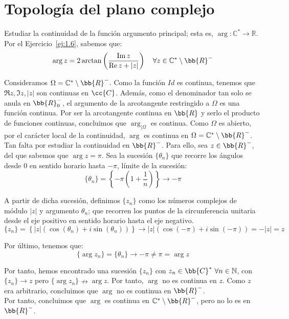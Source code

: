 \section{Topología del plano complejo}

\begin{ejercicio}
    Estudiar la continuidad de la función argumento principal; esta es, $\arg : \mathbb{C}^\ast \to \mathbb{R}$.\\

    Por el Ejercicio~\ref{ej:1.6}, sabemos que:
    \begin{equation*}
        \arg z = 2\arctan\left(\frac{\Im z}{\Re z + |z|}\right) \quad \forall z \in \mathbb{C}^\ast\setminus \bb{R}^-
    \end{equation*}

    Consideramos $\Omega = \mathbb{C}^\ast\setminus \bb{R}^-$. Como la función $Id$ es continua, tenemos que $\Re z,\Im z, |z|$ son continuas en $\cc{C}$. Además, como el denominador tan solo se anula en $\bb{R}^-_0$, el argumento de la arcotangente restringido a $\Omega$ es una función continua. Por ser la arcotangente continua en $\bb{R}$ y serlo el producto de funciones continuas, concluimos que $\arg_{\big| \Omega}$ es continua. Como $\Omega$ es abierto, por el carácter local de la continuidad, $\arg$ es continua en $\Omega=\mathbb{C}^\ast\setminus \bb{R}^-$.\\

    Tan falta por estudiar la continuidad en $\bb{R}^-$. Para ello, sea $z\in \bb{R}^-$, del que sabemos que $\arg z = \pi$. Sea la sucesión $\{\theta_n\}$ que recorre los ángulos desde $0$ en sentido horario hasta $-\pi$, límite de la sucesión:
    \begin{equation*}
        \{\theta_n\} = \left\{-\pi\left(1+\frac{1}{n}\right)\right\}\to -\pi
    \end{equation*}

    A partir de dicha sucesión, definimos $\{z_n\}$ como los números complejos de módulo $|z|$ y argumento $\theta_n$; que recorren los puntos de la circunferencia unitaria desde el eje positivo en sentido horario hasta el eje negativo.
    \begin{equation*}
        \{z_n\} = \left\{|z|\left(\cos\left(\theta_n\right)+i\sin\left(\theta_n\right)\right)\right\}\to |z|\left(\cos(-\pi)+i\sin(-\pi)\right) = -|z| = z
    \end{equation*}

    Por último, tenemos que:
    \begin{equation*}
        \{\arg z_n\} = \{\theta_n\} \to -\pi\neq \pi = \arg z
    \end{equation*}

    Por tanto, hemos encontrado una sucesión $\{z_n\}$ con $z_n\in \bb{C}^*~\forall n\in \mathbb{N}$, con $\{z_n\}\to z$ pero $\{\arg z_n\}\nrightarrow \arg z$. Por tanto, $\arg$ no es continua en $z$. Como $z$ era arbitrario, concluimos que $\arg$ no es continua en $\bb{R}^-$.\\

    Por tanto, concluimos que $\arg$ es continua en $\mathbb{C}^\ast\setminus \bb{R}^-$, pero no lo es en $\bb{R}^-$.
\end{ejercicio}

